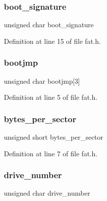 \subsubsection{\texorpdfstring{boot\+\_\+signature}{boot\_signature}}
{\footnotesize\ttfamily unsigned char boot\+\_\+signature}



Definition at line 15 of file fat.\+h.

\mbox{\label{a00158_a9d09d7d5af910f75a499a71fc8db1cb1_a9d09d7d5af910f75a499a71fc8db1cb1}} 
\subsubsection{\texorpdfstring{bootjmp}{bootjmp}}
{\footnotesize\ttfamily unsigned char bootjmp\mbox{[}3\mbox{]}}



Definition at line 5 of file fat.\+h.

\mbox{\label{a00158_a383840c631d2e9d53e46b6bc5d17c3eb_a383840c631d2e9d53e46b6bc5d17c3eb}} 
\subsubsection{\texorpdfstring{bytes\+\_\+per\+\_\+sector}{bytes\_per\_sector}}
{\footnotesize\ttfamily unsigned short bytes\+\_\+per\+\_\+sector}



Definition at line 7 of file fat.\+h.

\mbox{\label{a00158_ace7cd596c41a03630b828ad71042c645_ace7cd596c41a03630b828ad71042c645}} 
\subsubsection{\texorpdfstring{drive\+\_\+number}{drive\_number}}
{\footnotesize\ttfamily unsigned char drive\+\_\+number}



